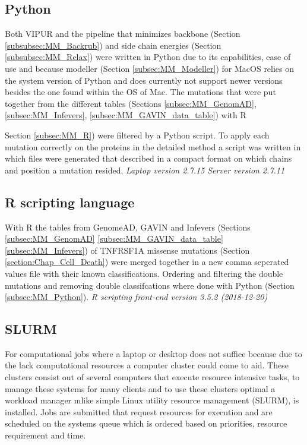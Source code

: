 \subsection{Python}
Both VIPUR and the pipeline that minimizes backbone (Section \ref{subsubsec:MM_Backrub}) and side chain energies (Section \ref{subsubsec:MM_Relax}) were written in Python due to its capabilities, ease of use and because modeller (Section \ref{subsec:MM_Modeller}) for MacOS relies on the system version of Python and does currently not support newer versions besides the one found within the OS of Mac. The mutations that were put together from the different tables (Sections \ref{subsec:MM_GenomAD}, \ref{subsec:MM_Infevers}, \ref{subsec:MM_GAVIN_data_table}) with R {Section \ref{subsec:MM_R}) were filtered by a Python script. To apply each mutation correctly on the proteins in the detailed method a script was written in which files were generated that described in a compact format on which chains and position a mutation resided.
\label{subsec:MM_Python}
\newline
\textit{Laptop version 2.7.15}
\newline
\textit{Server version 2.7.11}

\subsection{R scripting language}
With R the tables from GenomeAD, GAVIN and Infevers (Sections \ref{subsec:MM_GenomAD} \ref{subsec:MM_GAVIN_data_table} \ref{subsec:MM_Infevers}) of TNFRSF1A missense mutations (Section \ref{section:Chap_Cell_Death}) were merged together in a new comma seperated values file with their known classifications. Ordering and filtering the double mutations and removing double classifcations where done with Python (Section \ref{subsec:MM_Python}).
\label{subsec:MM_R}
\newline
\textit{R scripting front-end version 3.5.2 (2018-12-20)}

\subsection{SLURM}
For computational jobs where a laptop or desktop does not suffice because due to the lack computational resources a computer cluster could come to aid. These clusters consist out of several computers that execute resource intensive tasks, to manage these systems for many clients and to use these clusters optimal a workload manager mlike simple Linux utility resource management (SLURM), is installed. Jobs are submitted that request resources for execution and are scheduled on the systems queue which is ordered based on priorities, resource requirement and time.
\label{subsec:MM_SLURM}

}
